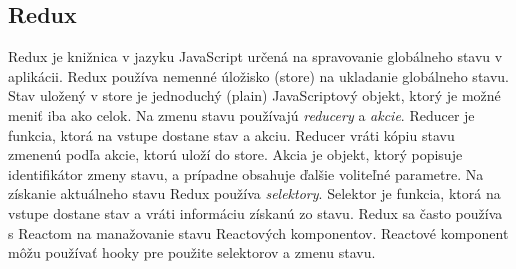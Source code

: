 \subsection{Redux}

Redux \cite{Reduxdocs} je knižnica v jazyku JavaScript určená na spravovanie globálneho stavu v aplikácii. Redux používa nemenné úložisko (store) na ukladanie globálneho stavu. Stav uložený v store je jednoduchý (plain) JavaScriptový objekt, ktorý je možné meniť iba ako celok. Na zmenu stavu používajú \emph{reducery} a \emph{akcie}. Reducer je funkcia, ktorá na vstupe dostane stav a akciu. Reducer vráti kópiu stavu zmenenú podľa akcie, ktorú uloží do store. Akcia je objekt, ktorý popisuje identifikátor zmeny stavu, a prípadne obsahuje ďalšie voliteľné parametre. Na získanie aktuálneho stavu Redux používa \emph{selektory}. Selektor je funkcia, ktorá na vstupe dostane stav a vráti informáciu získanú zo stavu.
Redux sa často používa s Reactom na manažovanie stavu Reactových komponentov. Reactové komponent môžu používať hooky pre použite selektorov a zmenu stavu.






